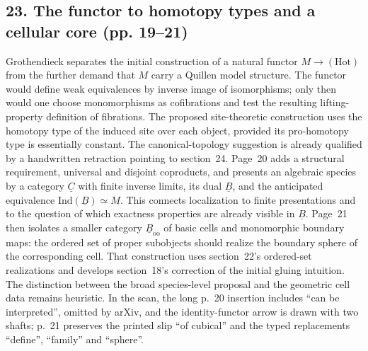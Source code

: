 \subsection*{23. The functor to homotopy types and a cellular core (pp. 19--21)}
Grothendieck separates the initial construction of a natural functor $M\to(\mathrm{Hot})$ from the further demand that $M$ carry a Quillen model structure. The functor would define weak equivalences by inverse image of isomorphisms; only then would one choose monomorphisms as cofibrations and test the resulting lifting-property definition of fibrations. The proposed site-theoretic construction uses the homotopy type of the induced site over each object, provided its pro-homotopy type is essentially constant. The canonical-topology suggestion is already qualified by a handwritten retraction pointing to section~24. Page~20 adds a structural requirement, universal and disjoint coproducts, and presents an algebraic species by a category $\underline C$ with finite inverse limits, its dual $\underline B$, and the anticipated equivalence $\mathrm{Ind}(\underline B)\simeq M$. This connects localization to finite presentations and to the question of which exactness properties are already visible in $\underline B$. Page~21 then isolates a smaller category $\underline B_{\mathrm{oo}}$ of basic cells and monomorphic boundary maps: the ordered set of proper subobjects should realize the boundary sphere of the corresponding cell. That construction uses section~22's ordered-set realizations and develops section~18's correction of the initial gluing intuition. The distinction between the broad species-level proposal and the geometric cell data remains heuristic. In the scan, the long p.~20 insertion includes ``can be interpreted'', omitted by arXiv, and the identity-functor arrow is drawn with two shafts; p.~21 preserves the printed slip ``of cubical'' and the typed replacements ``define'', ``family'' and ``sphere''.

